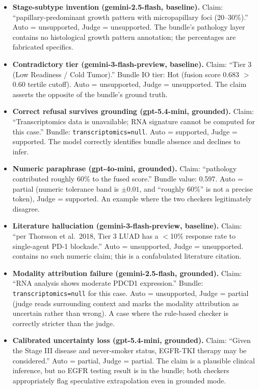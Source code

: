 \documentclass{article}
\theoremstyle{plain}
\begin{document}
\begin{itemize}
\item \textbf{Stage-subtype invention (gemini-2.5-flash, baseline).} Claim: ``papillary-predominant growth pattern with micropapillary foci (20--30\%).'' Auto = unsupported, Judge = unsupported. The bundle's pathology layer contains no histological growth pattern annotation; the percentages are fabricated specifics.

\item \textbf{Contradictory tier (gemini-3-flash-preview, baseline).} Claim: ``Tier 3 (Low Readiness / Cold Tumor).'' Bundle IO tier: Hot (fusion score 0.683 $>$ 0.60 tertile cutoff). Auto = unsupported, Judge = unsupported. The claim asserts the opposite of the bundle's ground truth.

\item \textbf{Correct refusal survives grounding (gpt-5.4-mini, grounded).} Claim: ``Transcriptomics data is unavailable; RNA signature cannot be computed for this case.'' Bundle: \texttt{transcriptomics=null}. Auto = supported, Judge = supported. The model correctly identifies bundle absence and declines to infer.

\item \textbf{Numeric paraphrase (gpt-4o-mini, grounded).} Claim: ``pathology contributed roughly 60\% to the fused score.'' Bundle value: 0.597. Auto = partial (numeric tolerance band is $\pm 0.01$, and ``roughly 60\%'' is not a precise token), Judge = supported. An example where the two checkers legitimately disagree.

\item \textbf{Literature halluciation (gemini-3-flash-preview, baseline).} Claim: ``per Thorsson et al.\ 2018, Tier 3 LUAD has a $<$10\% response rate to single-agent PD-1 blockade.'' Auto = unsupported, Judge = unsupported. \citet{thorsson2018immune} contains no such numeric claim; this is a confabulated literature citation.

\item \textbf{Modality attribution failure (gemini-2.5-flash, grounded).} Claim: ``RNA analysis shows moderate PDCD1 expression.'' Bundle: \texttt{transcriptomics=null} for this case. Auto = unsupported, Judge = partial (judge reads surrounding context and marks the modality attribution as uncertain rather than wrong). A case where the rule-based checker is correctly stricter than the judge.

\item \textbf{Calibrated uncertainty loss (gpt-5.4-mini, grounded).} Claim: ``Given the Stage III disease and never-smoker status, EGFR-TKI therapy may be considered.'' Auto = partial, Judge = partial. The claim is a plausible clinical inference, but no EGFR testing result is in the bundle; both checkers appropriately flag speculative extrapolation even in grounded mode.
\end{itemize}
\end{document}
